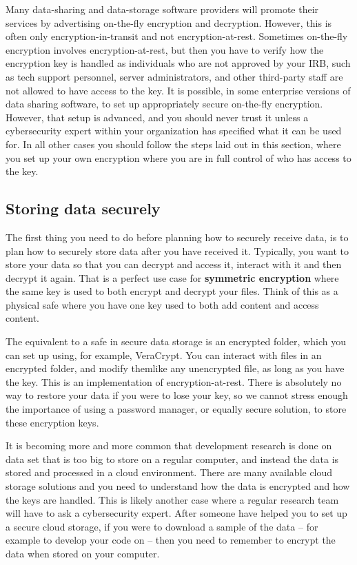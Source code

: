 Many data-sharing and data-storage software providers will promote their services
by advertising on-the-fly encryption and decryption.
However, this is often only encryption-in-transit and not encryption-at-rest.
Sometimes on-the-fly encryption involves encryption-at-rest,
but then you have to verify how the encryption key is handled
as individuals who are not approved by your IRB,
such as tech support personnel,
server administrators, and other third-party staff
are not allowed to have access to the key.
It is possible, in some enterprise versions of data sharing software,
to set up appropriately secure on-the-fly encryption.
However, that setup is advanced, and you should never trust it
unless a cybersecurity expert within your organization
has specified what it can be used for.
In all other cases you should follow the steps laid out in this section,
where you set up your own encryption
where you are in full control of who has access to the key.


\subsection{Storing data securely}
The first thing you need to do before planning how to securely receive data,
is to plan how to securely store data after you have received it.
Typically, you want to store your data so that you can decrypt and access it,
interact with it and then decrypt it again.
That is a perfect use case for \textbf{symmetric encryption}
where the same key is used to both encrypt and decrypt your files.
Think of this as a physical safe where you have one key
used to both add content and access content.

The equivalent to a safe in secure data storage is an encrypted folder,
which you can set up using, for example, VeraCrypt.
You can interact with files in an encrypted folder, and modify themlike any unencrypted file,
as long as you have the key.
This is an implementation of encryption-at-rest.
There is absolutely no way to restore your data if you were to lose your key,
so we cannot stress enough the importance of using a password manager,
or equally secure solution, to store these encryption keys.

It is becoming more and more common that development research
is done on data set that is too big to store on a regular computer,
and instead the data is stored and processed in a cloud environment.
There are many available cloud storage solutions
and you need to understand how the data is encrypted and how the keys are handled.
This is likely another case where a regular research team will have to ask a cybersecurity expert.
After someone have helped you to set up a secure cloud storage,
if you were to download a sample of the data --
for example to develop your code on --
then you need to remember to encrypt the data when stored on your computer.

